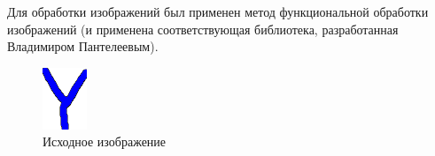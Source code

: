 \documentclass[russian,utf8,emptystyle]{eskdtext}
\begin{document}
Для обработки изображений был применен метод функциональной обработки изображений (и применена соответствующая библиотека, разработанная Владимиром Пантелеевым).
\begin{figure}[!htb]
\includegraphics[width=\linewidth]{input-ex-source}
\caption{Исходное изображение}
\endminipage\hfill
{}

\end{figure}
\end{document}
